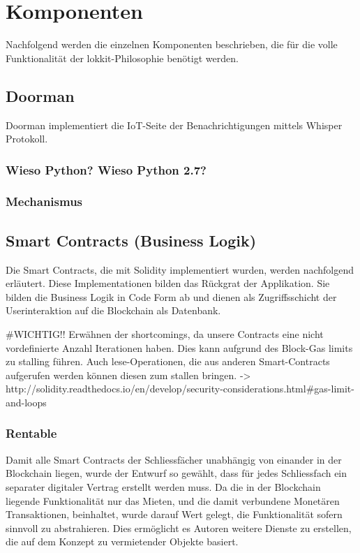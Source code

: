 \section{Komponenten}
\label{sec:Komponenten}
Nachfolgend werden die einzelnen Komponenten beschrieben, die für die volle Funktionalität der lokkit-Philosophie benötigt werden.
\subsection{Doorman}
Doorman implementiert die IoT-Seite der Benachrichtigungen mittels Whisper Protokoll.
\subsubsection{Wieso Python? Wieso Python 2.7?}
\subsubsection{Mechanismus}

\subsection{Smart Contracts (Business Logik)}
Die Smart Contracts, die mit Solidity implementiert wurden, werden nachfolgend erläutert. Diese Implementationen bilden das Rückgrat der Applikation. Sie bilden die Business Logik in Code Form ab und dienen als Zugriffsschicht der Userinteraktion auf die Blockchain als Datenbank.

\#WICHTIG!!
Erwähnen der shortcomings, da unsere Contracts eine nicht vordefinierte Anzahl Iterationen haben. Dies kann aufgrund des Block-Gas limits zu stalling führen. Auch lese-Operationen, die aus anderen Smart-Contracts aufgerufen werden können diesen zum stallen bringen. -> http://solidity.readthedocs.io/en/develop/security-considerations.html\#gas-limit-and-loops

\subsubsection{Rentable}
Damit alle Smart Contracts der Schliessfächer unabhängig von einander in der Blockchain liegen, wurde der Entwurf so gewählt, dass für jedes Schliessfach ein separater digitaler Vertrag erstellt werden muss. Da die in der Blockchain liegende Funktionalität nur das Mieten, und die damit verbundene Monetären Transaktionen, beinhaltet, wurde darauf Wert gelegt, die Funktionalität sofern sinnvoll zu abstrahieren. Dies ermöglicht es Autoren weitere Dienste zu erstellen, die auf dem Konzept zu vermietender Objekte basiert.
